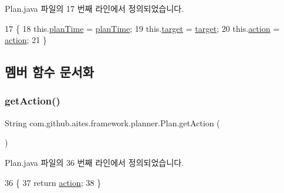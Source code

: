 Plan.\+java 파일의 17 번째 라인에서 정의되었습니다.


\begin{DoxyCode}
17                                                              \{
18         this.\mbox{\hyperlink{classcom_1_1github_1_1aites_1_1framework_1_1planner_1_1_plan_a4729359a276d3dda6350a16233754f9e}{planTime}} = \mbox{\hyperlink{classcom_1_1github_1_1aites_1_1framework_1_1planner_1_1_plan_a4729359a276d3dda6350a16233754f9e}{planTime}};
19         this.\mbox{\hyperlink{classcom_1_1github_1_1aites_1_1framework_1_1planner_1_1_plan_a3f45ee392c1af51834376a138bf8f325}{target}} = \mbox{\hyperlink{classcom_1_1github_1_1aites_1_1framework_1_1planner_1_1_plan_a3f45ee392c1af51834376a138bf8f325}{target}};
20         this.\mbox{\hyperlink{classcom_1_1github_1_1aites_1_1framework_1_1planner_1_1_plan_a7b7babde3735425a6e14a679bff3150c}{action}} = \mbox{\hyperlink{classcom_1_1github_1_1aites_1_1framework_1_1planner_1_1_plan_a7b7babde3735425a6e14a679bff3150c}{action}};
21     \}
\end{DoxyCode}


\subsection{멤버 함수 문서화}
\mbox{\label{classcom_1_1github_1_1aites_1_1framework_1_1planner_1_1_plan_af73a6ef1c0276f733948ea7fdb70aca7}} 
\subsubsection{\texorpdfstring{get\+Action()}{getAction()}}
{\footnotesize\ttfamily String com.\+github.\+aites.\+framework.\+planner.\+Plan.\+get\+Action (\begin{DoxyParamCaption}{ }\end{DoxyParamCaption})}



Plan.\+java 파일의 36 번째 라인에서 정의되었습니다.


\begin{DoxyCode}
36                              \{
37         \textcolor{keywordflow}{return} \mbox{\hyperlink{classcom_1_1github_1_1aites_1_1framework_1_1planner_1_1_plan_a7b7babde3735425a6e14a679bff3150c}{action}};
38     \}
\end{DoxyCode}
\mbox{\label{classcom_1_1github_1_1aites_1_1framework_1_1planner_1_1_plan_a661fbbeebc5bf62dafc4e5c3e19bce00}} 
